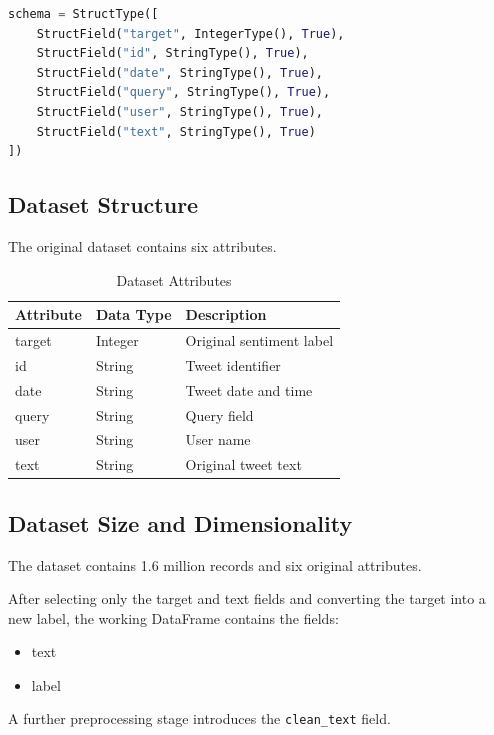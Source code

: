\documentclass[12pt,a4paper]{article}
\begin{document}
\begin{lstlisting}[language=Python]
schema = StructType([
    StructField("target", IntegerType(), True),
    StructField("id", StringType(), True),
    StructField("date", StringType(), True),
    StructField("query", StringType(), True),
    StructField("user", StringType(), True),
    StructField("text", StringType(), True)
])
\end{lstlisting}

\subsection{Dataset Structure}

The original dataset contains six attributes.

\begin{table}[H]
\centering
\caption{Dataset Attributes}
\begin{tabular}{lll}
\toprule
\textbf{Attribute} & \textbf{Data Type} & \textbf{Description} \\
\midrule
target & Integer & Original sentiment label \\
id & String & Tweet identifier \\
date & String & Tweet date and time \\
query & String & Query field \\
user & String & User name \\
text & String & Original tweet text \\
\bottomrule
\end{tabular}
\end{table}



\subsection{Dataset Size and Dimensionality}

The dataset contains 1.6 million records and six original attributes.

After selecting only the target and text fields and converting the target into a new label, the working DataFrame contains the fields:

\begin{itemize}
    \item text
    \item label
\end{itemize}

A further preprocessing stage introduces the \texttt{clean\_text} field.
\end{document}

